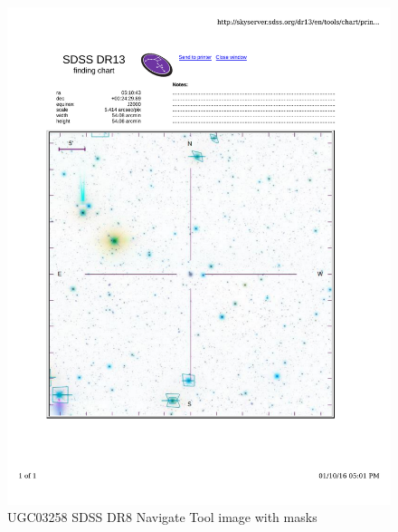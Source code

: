 \documentclass[10pt,letterpaper]{article}
\begin{document}
\begin{figure}[h!]
\centering
\includegraphics[scale=0.7]{figures/UGC03258.pdf}
\caption{UGC03258 SDSS DR8 Navigate Tool image with masks}
\end{figure}
\end{document}
